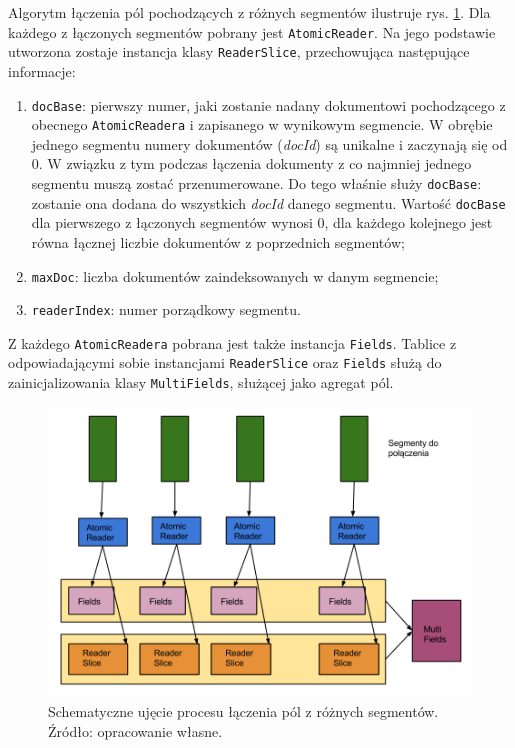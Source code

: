 Algorytm łączenia pól pochodzących z różnych segmentów ilustruje rys. \ref{fig:fieldMerge}. Dla każdego z łączonych segmentów pobrany jest \texttt{AtomicReader}. Na jego podstawie utworzona zostaje instancja klasy \texttt{ReaderSlice}, przechowująca następujące informacje:
\begin{enumerate}
 \item \texttt{docBase}: pierwszy numer, jaki zostanie nadany dokumentowi pochodzącego z obecnego \texttt{AtomicReadera} i zapisanego w wynikowym segmencie. W obrębie jednego segmentu numery dokumentów (\emph{docId}) są unikalne i zaczynają się od 0. W związku z tym podczas łączenia dokumenty z co najmniej jednego segmentu muszą zostać przenumerowane. Do tego właśnie służy \texttt{docBase}: zostanie ona dodana do wszystkich \emph{docId} danego segmentu. Wartość \texttt{docBase} dla pierwszego z łączonych segmentów wynosi 0, dla każdego kolejnego jest równa łącznej liczbie dokumentów z poprzednich segmentów;
 \item \texttt{maxDoc}: liczba dokumentów zaindeksowanych w danym segmencie;
 \item \texttt{readerIndex}: numer porządkowy segmentu.
\end{enumerate}

Z każdego \texttt{AtomicReadera} pobrana jest także instancja \texttt{Fields}. Tablice z odpowiadającymi sobie instancjami \texttt{ReaderSlice} oraz \texttt{Fields} służą do zainicjalizowania klasy \texttt{MultiFields}, służącej jako agregat pól.

\begin{figure}[here]
 \includegraphics[scale=0.4]{pictures/LaczeniePol.png}
 \caption{Schematyczne ujęcie procesu łączenia pól z różnych segmentów. Źródło: opracowanie własne. \label{fig:fieldMerge}}
\end{figure}

